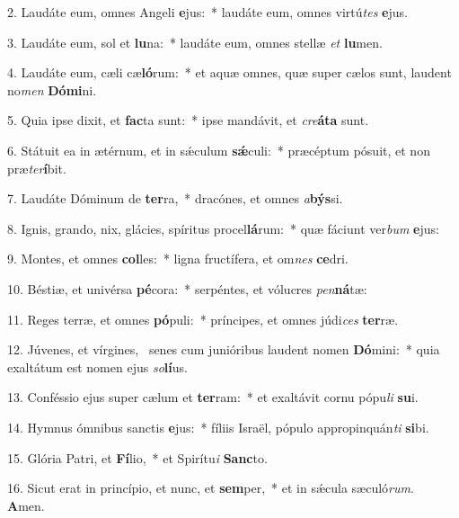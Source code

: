 2. Laudáte eum, omnes Angeli \textbf{e}jus:~*  laudáte eum, omnes virtú\textit{tes} \textbf{e}jus.\

3. Laudáte eum, sol et \textbf{lu}na:~*  laudáte eum, omnes stellæ \textit{et} \textbf{lu}men.\

4. Laudáte eum, cæli cæ\textbf{ló}rum:~*  et aquæ omnes, quæ super cælos sunt, laudent no\textit{men} \textbf{Dó}\textbf{mi}ni.\

5. Quia ipse dixit, et \textbf{fac}ta sunt:~*  ipse mandávit, et \textit{cre}\textbf{á}\textbf{ta} sunt.\

6. Státuit ea in ætérnum, et in sǽculum \textbf{sǽ}culi:~*  præcéptum pósuit, et non præ\textit{ter}\textbf{í}bit.\

7. Laudáte Dóminum de \textbf{ter}ra,~*  dracónes, et omnes \textit{a}\textbf{býs}si.\

8. Ignis, grando, nix, glácies, spíritus procel\textbf{lá}rum:~*  quæ fáciunt ver\textit{bum} \textbf{e}jus:\

9. Montes, et omnes \textbf{col}les:~*  ligna fructífera, et om\textit{nes} \textbf{ce}dri.\

10. Béstiæ, et univérsa \textbf{pé}cora:~*  serpéntes, et vólucres \textit{pen}\textbf{ná}tæ:\

11. Reges terræ, et omnes \textbf{pó}puli:~*  príncipes, et omnes júdi\textit{ces} \textbf{ter}ræ.\

12. Júvenes, et vírgines, \dag\  senes cum junióribus laudent nomen \textbf{Dó}mini:~*  quia exaltátum est nomen ejus \textit{so}\textbf{lí}us.\

13. Conféssio ejus super cælum et \textbf{ter}ram:~*  et exaltávit cornu pópu\textit{li} \textbf{su}i.\

14. Hymnus ómnibus sanctis \textbf{e}jus:~*  fíliis Israël, pópulo appropinquán\textit{ti} \textbf{si}bi.\

15. Glória Patri, et \textbf{Fí}lio,~*  et Spirítu\textit{i} \textbf{Sanc}to.\

16. Sicut erat in princípio, et nunc, et \textbf{sem}per,~*  et in sǽcula sæculó\textit{rum}. \textbf{A}men.\

